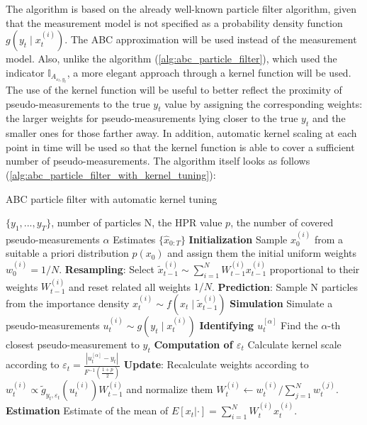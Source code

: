 The algorithm is based on the already well-known particle filter algorithm, given that the measurement model is not specified as a probability density function \(g\left(y_t \mid x_t^{(i)} \right)\). The ABC approximation will be used instead of the measurement model. Also, unlike the algorithm (\ref{alg:abc_particle_filter}), which used the indicator \(\mathbb{I}_{A_{{\varepsilon_t, y_t}}}\), a more elegant approach through a kernel function will be used. The use of the kernel function will be useful to better reflect the proximity of pseudo-measurements to the true \(y_t\) value by assigning the corresponding weights: the larger weights for pseudo-measurements lying closer to the true \(y_t\) and the smaller ones for those farther away. In addition, automatic kernel scaling at each point in time will be used so that the kernel function is able to cover a sufficient number of pseudo-measurements. The algorithm itself looks as follows (\ref{alg:abc_particle_filter_with_kernel_tuning}):

\begin{algorithm}
    \caption{ABC particle filter with automatic kernel tuning}
  \begin{algorithmic}[1]
    \INPUT \(\{y_1, . . . , y_T\}\), number of particles N, the HPR value \(p\), the number of covered pseudo-measurements \(\alpha\)
    \OUTPUT Estimates \(\{\hat{x}_{0:T}\}\)
    \STATE \textbf{Initialization} Sample \(x_0^{(i)}\) from a suitable a priori distribution \(p(x_0)\) and assign them the initial uniform weights \(w_0^{(i)} = 1/N\).
      \STATE \textbf{Resampling}: Select \(\tilde{x}_{t-1}^{(i)}\sim \sum_{i=1}^N W_{t-1}^{(i)} x_{t-1}^{(i)}\) proportional to their weights \(W_{t-1}^{(i)}\) and reset related all weights \(1/N\).
      \STATE \textbf{Prediction}: Sample N particles from the importance density \(x_t^{(i)} \sim f\left(x_t \mid \tilde{x}_{t-1}^{(i)}\right)\)
      \STATE \textbf{Simulation} Simulate a pseudo-measurements $u_t^{(i)} \sim g\left(y_t \mid x_t^{(i)} \right)$
      \STATE \textbf{Identifying \(u_t^{[\alpha]}\)} Find the \(\alpha\)-th closest pseudo-measurement to \(y_t\)
      \STATE \textbf{Computation of \(\varepsilon_t\)} Calculate kernel scale according to $    \varepsilon_t=\frac{\left|u_t^{[\alpha]}-y_t\right|}{F^{-1}\left(\frac{1+p}{2}\right)}$
      \STATE \textbf{Update}: Recalculate weights according to
      \(w_t^{(i)} \propto \tilde{g}_{y_t, \varepsilon_t}\left(u_t^{(i)}\right) W_{t-1}^{(i)}\) and normalize them \(W_t^{(i)} \leftarrow w_t^{(i)}/\sum_{j=1}^N w_t^{(j)}\).
    \STATE \textbf{Estimation} Estimate of the mean of \(E[x_t|\cdot] = \sum_{i=1}^{N}W_{t}^{(i)} x_t^{(i)}\).
    \ENDFOR
  \end{algorithmic}
  \label{alg:abc_particle_filter_with_kernel_tuning}
\end{algorithm}

